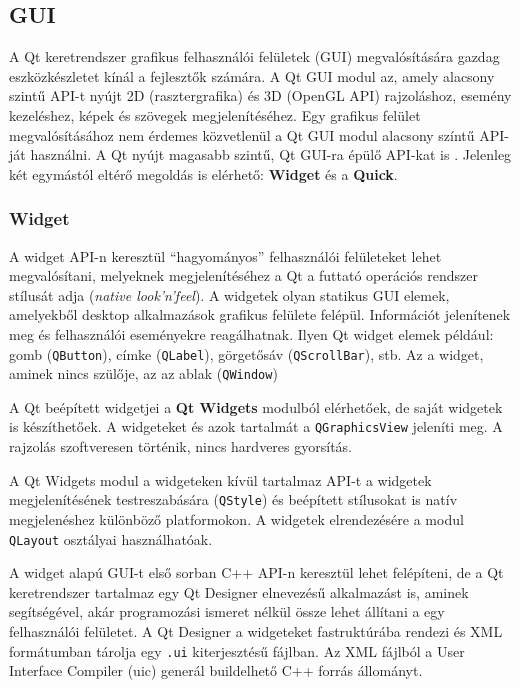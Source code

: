 \documentclass[12pt]{report}
\begin{document}
\subsection{GUI}
\label{sec:qt-gui}
A Qt keretrendszer grafikus felhasználói felületek (GUI) megvalósítására gazdag
eszközkészletet kínál a fejlesztők számára. A Qt GUI modul \cite{bib:qt-doc-qt-gui} az,
amely alacsony szintű API-t nyújt 2D (rasztergrafika) és 3D (OpenGL API) rajzoláshoz,
esemény kezeléshez, képek és szövegek megjelenítéséhez.
Egy grafikus felület megvalósításához nem érdemes közvetlenül a Qt GUI modul
alacsony színtű API-ját használni. A Qt nyújt magasabb szintű, Qt GUI-ra épülő API-kat is
\cite{bib:qt-doc-user-interfaces}.
Jelenleg két egymástól eltérő megoldás is elérhető: \textbf{Widget} és a \textbf{Quick}.

\subsubsection{Widget}
A widget API-n \cite{bib:qt-doc-qt-widgets} keresztül ``hagyományos'' felhasználói
felületeket lehet megvalósítani, melyeknek megjelenítéséhez a Qt a futtató operációs
rendszer stílusát adja (\textit{native look'n'feel}). A widgetek olyan statikus GUI elemek,
amelyekből desktop alkalmazások grafikus felülete felépül. Információt jelenítenek meg és
felhasználói eseményekre reagálhatnak. Ilyen Qt widget elemek például:
gomb (\texttt{QButton}), címke (\texttt{QLabel}), görgetősáv (\texttt{QScrollBar}), stb.
Az a widget, aminek nincs szülője, az az ablak (\texttt{QWindow})

A Qt beépített widgetjei a \textbf{Qt Widgets} modulból elérhetőek, de saját widgetek is
készíthetőek. A widgeteket és azok tartalmát a \texttt{QGraphicsView} jeleníti meg. A rajzolás
szoftveresen történik, nincs hardveres gyorsítás.

A Qt Widgets modul a widgeteken kívül tartalmaz API-t a widgetek megjelenítésének
testreszabására (\texttt{QStyle}) és beépített stílusokat is natív megjelenéshez különböző
platformokon. A widgetek elrendezésére a modul \texttt{QLayout} osztályai használhatóak.

A widget alapú GUI-t első sorban C++ API-n keresztül lehet felépíteni, de a Qt
keretrendszer tartalmaz egy Qt Designer elnevezésű alkalmazást is, aminek segítségével,
akár programozási ismeret nélkül össze lehet állítani a egy felhasználói felületet.
A Qt Designer a widgeteket fastruktúrába rendezi és XML formátumban tárolja egy \texttt{.ui}
kiterjesztésű fájlban. Az XML fájlból a User Interface Compiler (uic) generál buildelhető
C++ forrás állományt.
\end{document}
